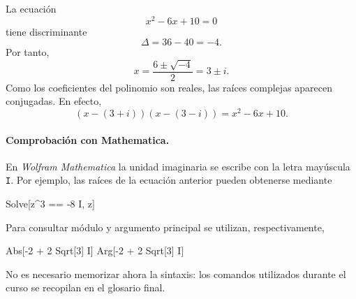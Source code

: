 \begin{example}
La ecuación
\[
x^2-6x+10=0
\]
tiene discriminante
\[
\Delta=36-40=-4.
\]
Por tanto,
\[
x=\frac{6\pm\sqrt{-4}}2=3\pm i.
\]
Como los coeficientes del polinomio son reales, las raíces complejas aparecen conjugadas. En efecto,
\[
(x-(3+i))(x-(3-i))=x^2-6x+10.
\]
\end{example}

\paragraph{Comprobación con Mathematica.}
En \textit{Wolfram Mathematica} la unidad imaginaria se escribe con la letra mayúscula \texttt{I}. Por ejemplo, las raíces de la ecuación anterior pueden obtenerse mediante
\begin{mathematicacode}
Solve[z^3 == -8 I, z]
\end{mathematicacode}
Para consultar módulo y argumento principal se utilizan, respectivamente,
\begin{mathematicacode}
Abs[-2 + 2 Sqrt[3] I]
Arg[-2 + 2 Sqrt[3] I]
\end{mathematicacode}
No es necesario memorizar ahora la sintaxis: los comandos utilizados durante el curso se recopilan en el glosario final.
